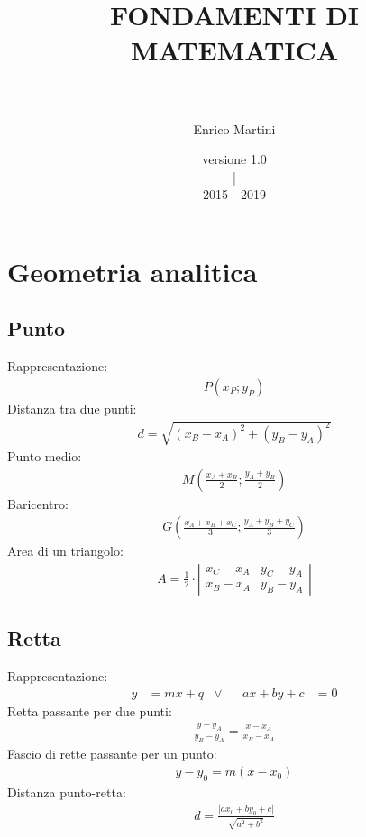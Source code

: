 \documentclass[a4paper]{article}
\title{\fontsize{50}{60}\selectfont FONDAMENTI DI MATEMATICA}
\author{\\\\Enrico Martini}
\date{\small versione 1.0 \\| \\2015 - 2019}
\begin{document}
	
	\maketitle
	\thispagestyle{empty}
	\newpage
	\tableofcontents
	\thispagestyle{empty}
	\newpage
	
	\section{Geometria analitica}
	\subsection{Punto}
	Rappresentazione:
	\begin{align*}
		P(x_P;y_P)
	\end{align*}
	Distanza tra due punti:
	\begin{align*}
		d = \sqrt{(x_B -x _A)^2+(y_B - y_A)^2}
	\end{align*}
	Punto medio:
	\begin{align*}
		M \left( \frac{x_A + x_B}{2} ; \frac{y_A + y_B}{2} \right)
	\end{align*}
	Baricentro:
	\begin{align*}
		G \left( \frac{x_A + x_B + x_C}{3} ; \frac{y_A + y_B + y_C}{3} \right) 
	\end{align*}
	Area di un triangolo:
	\begin{align*}
		A = \frac{1}{2} \cdot \left| \begin{array}{cc}
		x_C-x_A & y_C-y_A \\ 
		x_B-x_A & y_B-y_A
		\end{array} \right|
	\end{align*}
	
	\subsection{Retta}
	Rappresentazione:
	\begin{align*}
		y &= mx + q		&\vee&&		ax + by + c & = 0
	\end{align*}
	Retta passante per due punti:
	\begin{align*}
		\frac{y-y_A}{y_B-y_A} = \frac{x-x_A}{x_B-x_A}
	\end{align*}
	Fascio di rette passante per un punto:
	\begin{align*}
		y-y_0 = m(x-x_0)
	\end{align*}
	Distanza punto-retta:
	\begin{align*}
		d = \frac{|ax_0+by_0+c|}{\sqrt{a^2+b^2}}
	\end{align*}
		
\end{document}
